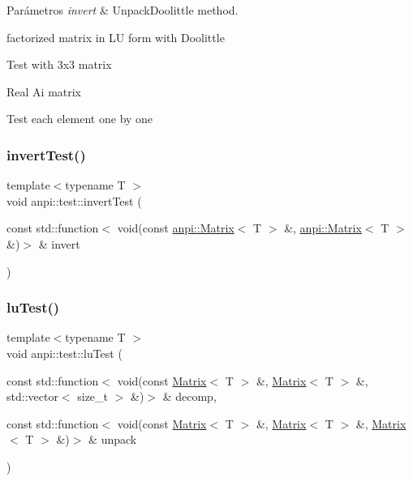 \begin{DoxyParams}{Parámetros}
{\em invert} & Unpack\+Doolittle method. \\
\hline
\end{DoxyParams}
factorized matrix in LU form with Doolittle

Test with 3x3 matrix

Real Ai matrix

Test each element one by one \mbox{\label{namespaceanpi_1_1test_a0befe6c5f1dbc4854338935efe425d06}} 
\subsubsection{\texorpdfstring{invert\+Test()}{invertTest()}\hspace{0.1cm}{\footnotesize\ttfamily [2/2]}}
{\footnotesize\ttfamily template$<$typename T $>$ \\
void anpi\+::test\+::invert\+Test (\begin{DoxyParamCaption}\item[{const std\+::function$<$ void(const \hyperlink{classanpi_1_1Matrix}{anpi\+::\+Matrix}$<$ T $>$ \&, \hyperlink{classanpi_1_1Matrix}{anpi\+::\+Matrix}$<$ T $>$ \&)$>$ \&}]{invert }\end{DoxyParamCaption})}

\mbox{\label{namespaceanpi_1_1test_a0baf1a43bc6d37c8b0bc22587b366656}} 
\subsubsection{\texorpdfstring{lu\+Test()}{luTest()}}
{\footnotesize\ttfamily template$<$typename T $>$ \\
void anpi\+::test\+::lu\+Test (\begin{DoxyParamCaption}\item[{const std\+::function$<$ void(const \hyperlink{classanpi_1_1Matrix}{Matrix}$<$ T $>$ \&, \hyperlink{classanpi_1_1Matrix}{Matrix}$<$ T $>$ \&, std\+::vector$<$ size\+\_\+t $>$ \&)$>$ \&}]{decomp,  }\item[{const std\+::function$<$ void(const \hyperlink{classanpi_1_1Matrix}{Matrix}$<$ T $>$ \&, \hyperlink{classanpi_1_1Matrix}{Matrix}$<$ T $>$ \&, \hyperlink{classanpi_1_1Matrix}{Matrix}$<$ T $>$ \&)$>$ \&}]{unpack }\end{DoxyParamCaption})}



